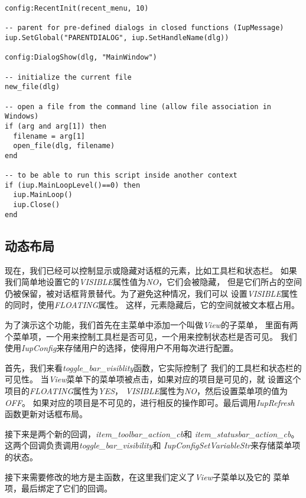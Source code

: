 \documentclass{ctexart}
\begin{document}
\begin{lstlisting}
config:RecentInit(recent_menu, 10)

-- parent for pre-defined dialogs in closed functions (IupMessage)
iup.SetGlobal("PARENTDIALOG", iup.SetHandleName(dlg))

config:DialogShow(dlg, "MainWindow")

-- initialize the current file
new_file(dlg)

-- open a file from the command line (allow file association in Windows)
if (arg and arg[1]) then
  filename = arg[1]
  open_file(dlg, filename)
end

-- to be able to run this script inside another context
if (iup.MainLoopLevel()==0) then
  iup.MainLoop()
  iup.Close()
end
\end{lstlisting}

\subsection{动态布局}

现在，我们已经可以控制显示或隐藏对话框的元素，比如工具栏和状态栏。
如果我们简单地设置它的\emph{VISIBLE}属性值为\emph{NO}，它们会被隐藏，
但是它们所占的空间仍被保留，被对话框背景替代。为了避免这种情况，我们可以
设置\emph{VISIBLE}属性的同时，使用\emph{FLOATING}属性。
这样，元素隐藏后，它的空间就被文本框占用。

为了演示这个功能，我们首先在主菜单中添加一个叫做\emph{View}的子菜单，
里面有两个菜单项，一个用来控制工具栏是否可见，一个用来控制状态栏是否可见。
我们使用\emph{IupConfig}来存储用户的选择，使得用户不用每次进行配置。

首先，我们来看\emph{toggle\_bar\_visiblity}函数，它实际控制了
我们的工具栏和状态栏的可见性。
当\emph{View}菜单下的菜单项被点击，如果对应的项目是可见的，就
设置这个项目的\emph{FLOATING}属性为\emph{YES}，
\emph{VISIBLE}属性为\emph{NO}，然后设置菜单项的值为\emph{OFF}。
如果对应的项目是不可见的，进行相反的操作即可。最后调用\emph{IupRefresh}
函数更新对话框布局。

接下来是两个新的回调，\emph{item\_toolbar\_action\_cb}和
\emph{item\_statusbar\_action\_cb}。
这两个回调负责调用\emph{toggle\_bar\_visibility}和
\emph{IupConfigSetVariableStr}来存储菜单项的状态。

接下来需要修改的地方是主函数，在这里我们定义了\emph{View}子菜单以及它的
菜单项，最后绑定了它们的回调。
\end{document}
